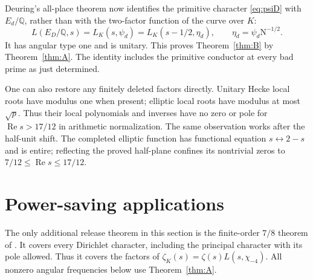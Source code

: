\documentclass[11pt,a4paper]{article}
\numberwithin{equation}{section}
\theoremstyle{definition}
\theoremstyle{remark}
\newcommand{\Q}{\mathbb Q}
\newcommand{\N}{\mathrm N}
\newcommand{\Rea}{\operatorname{Re}}
\begin{document}
Deuring's all-place theorem now identifies the primitive character \eqref{eq:psiD} with $E_d/\Q$, rather than with the two-factor function of the curve over $K$:
\begin{equation}\label{eq:deuring}
 L(E_D/\Q,s)=L_K(s,\psi_d)
           =L_K(s-1/2,\eta_d),\qquad \eta_d=\psi_d\N^{-1/2}.
\end{equation}
It has angular type one and is unitary. This proves Theorem~\ref{thm:B} by Theorem~\ref{thm:A}. The identity includes the primitive conductor at every bad prime as just determined.

One can also restore any finitely deleted factors directly. Unitary Hecke local roots have modulus one when present; elliptic local roots have modulus at most $\sqrt p$. Thus their local polynomials and inverses have no zero or pole for $\Rea s>17/12$ in arithmetic normalization. The same observation works after the half-unit shift. The completed elliptic function has functional equation $s\leftrightarrow2-s$ and is entire; reflecting the proved half-plane confines its nontrivial zeros to $7/12\le\Rea s\le17/12$.

\section{Power-saving applications}\label{sec:applications}
The only additional release theorem in this section is the finite-order $7/8$ theorem of \cite[Theorem 1.1]{QRH78}. It covers every Dirichlet character, including the principal character with its pole allowed. Thus it covers the factors of
$\zeta_K(s)=\zeta(s)L(s,\chi_{-4})$.
All nonzero angular frequencies below use Theorem~\ref{thm:A}.
\end{document}
